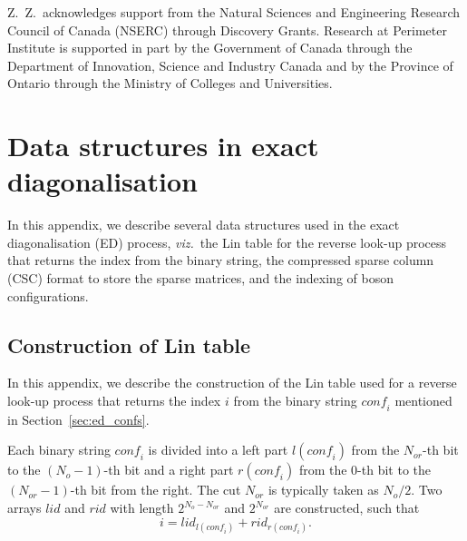 \documentclass{timesjhep}
\begin{document}
Z.~Z.~acknowledges support from the Natural Sciences and Engineering Research Council of Canada (NSERC) through Discovery Grants. Research at Perimeter Institute is supported in part by the Government of Canada through the Department of Innovation, Science and Industry Canada and by the Province of Ontario through the Ministry of Colleges and Universities.

\cleardoublepage
\appendix

\section{Data structures in exact diagonalisation}
\label{app:data}

In this appendix, we describe several data structures used in the exact diagonalisation (ED) process, \textit{viz.}~the Lin table for the reverse look-up process that returns the index from the binary string, the compressed sparse column (CSC) format to store the sparse matrices, and the indexing of boson configurations.

\subsection{Construction of Lin table}
\label{app:data_lin}

In this appendix, we describe the construction of the Lin table used for a reverse look-up process that returns the index $i$ from the binary string $\mathit{conf}_i$ mentioned in Section~\ref{sec:ed_confs}.

Each binary string $\mathit{conf}_i$ is divided into a left part $l(\mathit{conf}_i)$ from the $N_{or}$-th bit to the $(N_o-1)$-th bit and a right part $r(\mathit{conf}_i)$ from the $0$-th bit to the $(N_{or}-1)$-th bit from the right. The cut $N_{or}$ is typically taken as $N_o/2$. Two arrays $\mathit{lid}$ and $\mathit{rid}$ with length $2^{N_o-N_{or}}$ and $2^{N_{or}}$ are constructed, such that
\begin{equation}
    i=\mathit{lid}_{l(\mathit{conf}_i)}+\mathit{rid}_{r(\mathit{conf}_i)}.
\end{equation}
\end{document}
